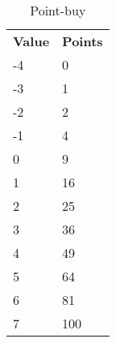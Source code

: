 \begin{table}[h!]
    \begin{tabular}{l l}
        \bfseries{Value} & \bfseries{Points} \\
        -4 & 0 \\
        -3 & 1 \\
        -2 & 2 \\
        -1 & 4 \\
        0 & 9 \\
        1 & 16 \\
        2 & 25 \\
        3 & 36 \\
        4 & 49 \\
        5 & 64 \\
        6 & 81 \\
        7 & 100 \\
    \end{tabular}
    \label{tab:point-buy}
    \caption{Point-buy}
\end{table}
